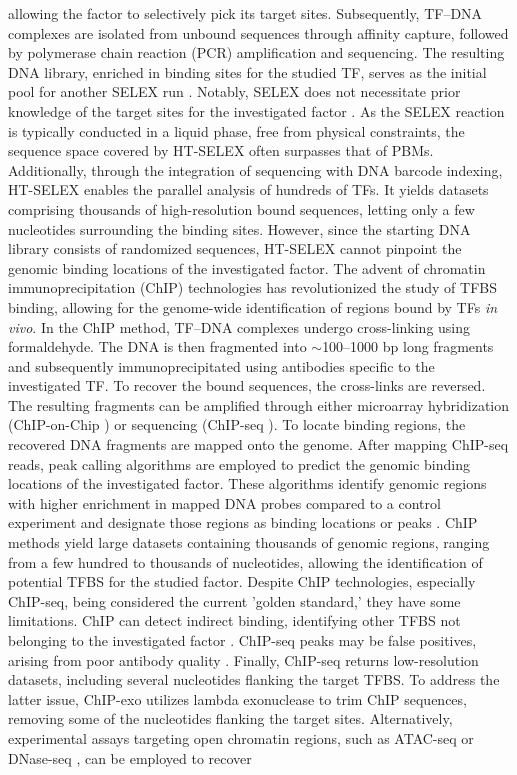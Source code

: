 \documentclass[a4paper, titlepage, openright]{book}
\begin{document}
allowing the factor to selectively pick its target sites. Subsequently, TF–DNA complexes are isolated from unbound sequences through affinity capture, followed by polymerase chain reaction (PCR) amplification and sequencing. The resulting DNA library, enriched in binding sites for the studied TF, serves as the initial pool for another SELEX run \citep{jolma2011methods,jolma2010multiplexed}. Notably, SELEX does not necessitate prior knowledge of the target sites for the investigated factor \citep{jolma2013dna}. As the SELEX reaction is typically conducted in a liquid phase, free from physical constraints, the sequence space covered by HT-SELEX often surpasses that of PBMs. Additionally, through the integration of sequencing with DNA barcode indexing, HT-SELEX enables the parallel analysis of hundreds of TFs. It yields datasets comprising thousands of high-resolution bound sequences, letting only a few nucleotides surrounding the binding sites. However, since the starting DNA library consists of randomized sequences, HT-SELEX cannot pinpoint the genomic binding locations of the investigated factor. The advent of chromatin immunoprecipitation (ChIP) technologies \citep{collas2008chop} has revolutionized the study of TFBS binding, allowing for the genome-wide identification of regions bound by TFs \emph{in vivo}. In the ChIP method, TF–DNA complexes undergo cross-linking using formaldehyde. The DNA is then fragmented into $\sim$100–1000 bp long fragments and subsequently immunoprecipitated using antibodies specific to the investigated TF. To recover the bound sequences, the cross-links are reversed. The resulting fragments can be amplified through either microarray hybridization (ChIP-on-Chip \citep{collas2008chop,pillai2015chip}) or sequencing (ChIP-seq \citep{johnson2007genome,mardis2007chip}). To locate binding regions, the recovered DNA fragments are mapped onto the genome. After mapping ChIP-seq reads, peak calling algorithms \citep{thomas2017features,guo2012high,zhang2008model} are employed to predict the genomic binding locations of the investigated factor. These algorithms identify genomic regions with higher enrichment in mapped DNA probes compared to a control experiment and designate those regions as binding locations or peaks \citep{pepke2009computation}. ChIP methods yield large datasets containing thousands of genomic regions, ranging from a few hundred to thousands of nucleotides, allowing the identification of potential TFBS for the studied factor. Despite ChIP technologies, especially ChIP-seq, being considered the current 'golden standard,' they have some limitations. ChIP can detect indirect binding, identifying other TFBS not belonging to the investigated factor \citep{worsley2014non}. ChIP-seq peaks may be false positives, arising from poor antibody quality \citep{pickrell2011false}. Finally, ChIP-seq returns low-resolution datasets, including several nucleotides flanking the target TFBS. To address the latter issue, ChIP-exo \citep{rhee2011comprehensive} utilizes lambda exonuclease to trim ChIP sequences, removing some of the nucleotides flanking the target sites. Alternatively, experimental assays targeting open chromatin regions, such as ATAC-seq \citep{buenrostro2013transposition} or DNase-seq \citep{john2011chromatin}, can be employed to recover 
\end{document}
